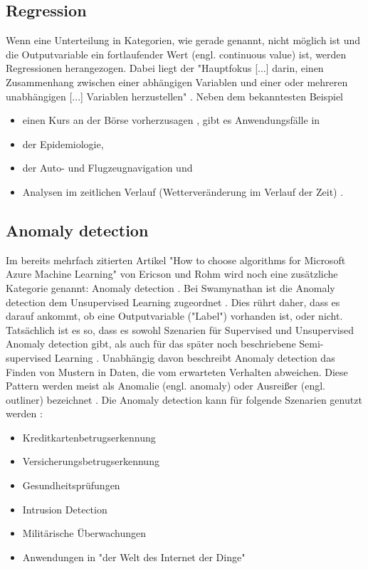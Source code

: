 \subsection{Regression}\label{subsubsec:regression}
Wenn eine Unterteilung in Kategorien, wie gerade genannt, nicht möglich ist und die Outputvariable ein fortlaufender Wert (engl. continuous value) ist, werden Regressionen herangezogen. Dabei liegt der "Hauptfokus [...] darin, einen Zusammenhang zwischen einer abhängigen Variablen und einer oder mehreren unabhängigen [...] Variablen herzustellen" \citep[S.~60; eigene Übersetzung]{swamynathan_mastering_2017}. Neben dem bekanntesten Beispiel
\begin{itemize}
\item einen Kurs an der Börse vorherzusagen , gibt es Anwendungsfälle in
\item der Epidemiologie,
\item der Auto- und Flugzeugnavigation und
\item Analysen im zeitlichen Verlauf (Wetterveränderung im Verlauf der Zeit) \citep[S.~5]{kauchak_neural_2016}.
\end{itemize}

\subsection{Anomaly detection}
Im bereits mehrfach zitierten Artikel "How to choose algorithms for Microsoft Azure Machine Learning" von Ericson und Rohm wird noch eine zusätzliche Kategorie genannt: Anomaly detection \citep{ericson_how_2017}. Bei Swamynathan ist die Anomaly detection dem Unsupervised Learning zugeordnet \citep[S.~68]{swamynathan_mastering_2017}. Dies rührt daher, dass es darauf ankommt, ob eine Outputvariable ("Label") vorhanden ist, oder nicht. Tatsächlich ist es so, dass es sowohl Szenarien für Supervised und Unsupervised Anomaly detection gibt, als auch für das später noch beschriebene Semi-supervised Learning \citep[S.~15:10]{chandola_anomaly_2009}.
Unabhängig davon beschreibt Anomaly detection das Finden von Mustern in Daten, die vom erwarteten Verhalten abweichen. Diese Pattern werden meist als Anomalie (engl. anomaly) oder Ausreißer (engl. outliner) bezeichnet \citep[S.~15:1]{chandola_anomaly_2009}.
Die Anomaly detection kann für folgende Szenarien genutzt werden \citep[S.~15:2]{chandola_anomaly_2009}:
\begin{itemize}
\item Kreditkartenbetrugserkennung
\item Versicherungsbetrugserkennung
\item Gesundheitsprüfungen
\item Intrusion Detection
\item Militärische Überwachungen
\item Anwendungen in "der Welt des Internet der Dinge" \citep[S.~68]{swamynathan_mastering_2017}
\end{itemize}

